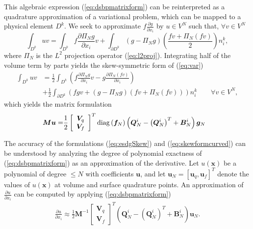 \documentclass{svjour3}                     %
\newcommand{\diag}[1]{{\rm diag}\LRp{#1}}
\newcommand{\pd}[2]{\frac{\partial#1}{\partial#2}}
\newcommand{\LRp}[1]{\left( #1 \right)}
\newcommand{\LRs}[1]{\left[ #1 \right]}
\begin{document}
This algebraic expression (\ref{eq:dsbpmatrixform}) can be reinterpreted as a quadrature approximation of a variational problem, which can be mapped to a physical element $D^k$.  We seek to approximate $f\pd{g}{x_i}$ by $u \in V^N$ such that, $\forall v\in V^N$
\begin{equation}
\int_{D^k} u v = \int_{D^k} f\pd{\Pi_N g}{{x}_i}v + \int_{\partial {D}^k} \LRp{g - \Pi_Ng} \LRp{\frac{fv + \Pi_N(fv)}{2}} {n}^k_i,\label{eq:var}
\end{equation}
where $\Pi_N$ is the $L^2$ projection operator (\ref{eq:l2proj}).  
Integrating half of the volume term by parts yields the skew-symmetric form of (\ref{eq:var})
\begin{align}
\int_{D^k} u  v &=\frac{1}{2} \int_{{D^k}} \LRp{f\pd{\Pi_N g}{{x}_i}v - g \pd{\Pi_N\LRp{fv}}{{x}_i}} \label{eq:skewDN}\\
&+\frac{1}{2} \int_{\partial {D}^k} \LRp{fgv + \LRp{g - \Pi_Ng} \LRp{{fv + \Pi_N(fv)}{}}} {n}^k_i \qquad \forall v\in V^N\nonumber,
\end{align}
which yields the matrix formulation
\begin{align}
\bm{M}\bm{u} =& \frac{1}{2}\LRs{\begin{array}{c}
\bm{V}_q \\ \bm{V}_f\end{array}}^T \diag{\bm{f}_N}\LRp{\bm{Q}^i_N - \LRp{\bm{Q}^i_N}^T + \bm{B}^i_N}\bm{g}_N \label{eq:dsbpmatrixform}
\end{align}

The accuracy of the formulations (\ref{eq:esdgSkew}) and (\ref{eq:skewformcurved}) can be understood by analyzing the degree of polynomial exactness of (\ref{eq:dsbpmatrixform}) as an approximation of the derivative.  Let $u(\bm{x})$ be a polynomial of degree $\leq N$ with coefficients $\bm{u}$, and let $\bm{u}_N = \LRs{\bm{u}_q, \bm{u}_f}^T$ denote the values of $u(\bm{x})$ at volume and surface quadrature points.  An approximation of $\pd{u}{x_i}$ can be computed by applying (\ref{eq:dsbpmatrixform})
\begin{align}
\pd{u}{x_i}\approx \frac{1}{2}\bm{M}^{-1}\LRs{\begin{array}{c}
\bm{V}_q \\ \bm{V}_f\end{array}}^T \LRp{\bm{Q}^i_N - \LRp{\bm{Q}^i_N}^T + \bm{B}^i_N}\bm{u}_N.
\label{eq:dsbpapprox}
\end{align}
\end{document}
